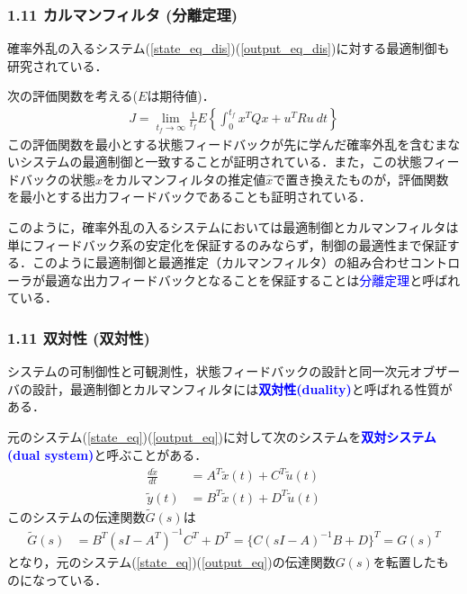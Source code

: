 \documentclass[10pt]{beamer}
\begin{document}
\begin{frame}[t]
\frametitle{1.11 カルマンフィルタ (分離定理)}
確率外乱の入るシステム(\ref{state_eq_dis})(\ref{output_eq_dis})に対する最適制御も研究されている．

次の評価関数を考える($E$は期待値)．
\begin{align}
  J=\lim_{t_f \rightarrow \infty} \frac{1}{t_f} E \left\{\int_0^{t_f} x^T Q x + u^T R u \ dt \right\}
\end{align}
この評価関数を最小とする状態フィードバックが先に学んだ確率外乱を含むまないシステムの最適制御と一致することが証明されている．また，この状態フィードバックの状態$x$をカルマンフィルタの推定値$\hat{x}$で置き換えたものが，評価関数を最小とする出力フィードバックであることも証明されている．

このように，確率外乱の入るシステムにおいては最適制御とカルマンフィルタは単にフィードバック系の安定化を保証するのみならず，制御の最適性まで保証する．このように最適制御と最適推定（カルマンフィルタ）の組み合わせコントローラが最適な出力フィードバックとなることを保証することは\textcolor{blue}{分離定理}と呼ばれている．
\end{frame}


\begin{frame}[t]
\frametitle{1.11 双対性 (双対性)}
システムの可制御性と可観測性，状態フィードバックの設計と同一次元オブザーバの設計，最適制御とカルマンフィルタには\textcolor{blue}{\bf 双対性(duality)}と呼ばれる性質がある．

元のシステム(\ref{state_eq})(\ref{output_eq})に対して次のシステムを\textcolor{blue}{\bf 双対システム(dual system)}と呼ぶことがある．
\begin{align}
 \frac{d \tilde{x}}{dt} &= A^T \tilde{x}(t) + C^T \tilde{u}(t)  \\
 \tilde{y}(t) &= B^T \tilde{x}(t) + D^T \tilde{u}(t) 
\end{align}
このシステムの伝達関数$\tilde{G}(s)$は
\begin{align}
  \tilde{G}(s) &= B^T (sI-A^T)^{-1} C^T + D^T = \{C(sI-A)^{-1}B + D\}^T = G(s)^T
\end{align}
となり，元のシステム(\ref{state_eq})(\ref{output_eq})の伝達関数$G(s)$を転置したものになっている．

\end{frame}
\end{document}

